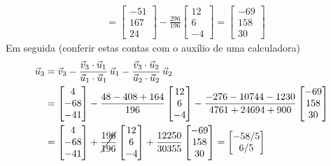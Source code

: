 \begin{ex}
\begin{align*}
& =
\begin{bmatrix}
 -51  \\
 167  \\
 24
\end{bmatrix} - \frac{296}{196}
\begin{bmatrix}
12 \\
6 \\
-4
\end{bmatrix} =
\begin{bmatrix}
 -69  \\
 158  \\
 30
\end{bmatrix}
  \end{align*}
 Em seguida (conferir estas contas com o auxílio de uma calculadora)
  \begin{align*}
\vec{u}_3 & = \vec{v}_3 - \frac{\vec{v}_3 \cdot \vec{u}_1}{\vec{u}_1 \cdot \vec{u}_1} \, \vec{u}_1 - \frac{\vec{v}_3 \cdot \vec{u}_2}{\vec{u}_2 \cdot \vec{u}_2} \, \vec{u}_2 \\
& = \begin{bmatrix}
  4 \\
 -68 \\
 -41
\end{bmatrix} - \frac{48-408 + 164}{196}
\begin{bmatrix}
12 \\
6 \\
-4
\end{bmatrix} - \frac{-276 - 10744 - 1230}{4761 + 24694 + 900}
\begin{bmatrix}
 -69  \\
 158  \\
 30
\end{bmatrix} \\
   & = \begin{bmatrix}
  4 \\
 -68 \\
 -41
\end{bmatrix} + \cancel{\frac{196}{196}}
\begin{bmatrix}
12 \\
6 \\
-4
\end{bmatrix} + \frac{12250}{30355}
\begin{bmatrix}
 -69  \\
 158  \\
 30
\end{bmatrix} = \begin{bmatrix}
 -58/5  \\
 6/5  \\

\end{bmatrix}
\end{align*}
\end{ex}
